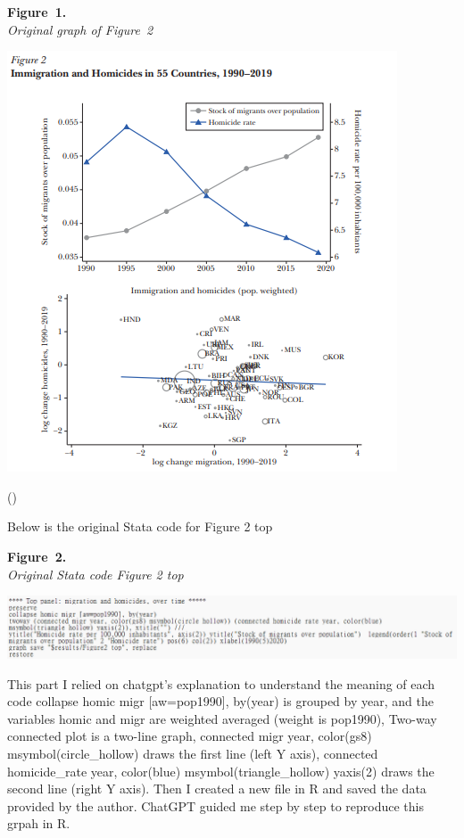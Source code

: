 \documentclass[
  jou,
  floatsintext,
  longtable,
  nolmodern,
  notxfonts,
  notimes,
  colorlinks=true,linkcolor=blue,citecolor=blue,urlcolor=blue]{apa7}
\begin{document}
\label{fig:original}
\textbf{Figure~1.}\\
\emph{Original graph of Figure~2}

\begin{center}
\includegraphics[width=0.8\linewidth,height=\textheight,keepaspectratio]{fig/Original.png}
\end{center}

()

Below is the original Stata code for Figure 2 top

\label{fig:statatop}
\textbf{Figure~2.}\\
\emph{Original Stata code Figure 2 top}

\begin{center}
\includegraphics[width=0.8\linewidth,height=\textheight,keepaspectratio]{fig/statatop.png}
\end{center}

This part I relied on chatgpt's explanation to understand the meaning of
each code collapse homic migr {[}aw=pop1990{]}, by(year) is grouped by
year, and the variables homic and migr are weighted averaged (weight is
pop1990), Two-way connected plot is a two-line graph, connected migr
year, color(gs8) msymbol(circle\_hollow) draws the first line (left Y
axis), connected homicide\_rate year, color(blue)
msymbol(triangle\_hollow) yaxis(2) draws the second line (right Y axis).
Then I created a new file in R and saved the data provided by the
author. ChatGPT guided me step by step to reproduce this grpah in R.
\end{document}
